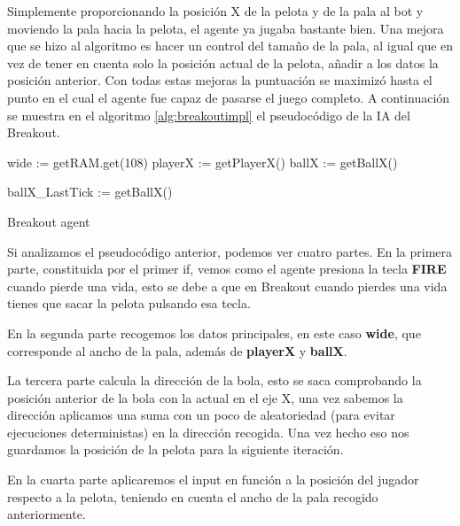 Simplemente proporcionando la posición X de la pelota y de la pala al bot y moviendo la pala hacia la pelota, el agente ya jugaba bastante bien. Una mejora que se hizo al algoritmo es hacer un control del tamaño de la pala, al igual que en vez de tener en cuenta solo la posición actual de la pelota, añadir a los datos la posición anterior. Con todas estas mejoras la puntuación se maximizó hasta el punto en el cual el agente fue capaz de pasarse el juego completo. A continuación se muestra en el algoritmo \ref{alg:breakoutimpl}
el pseudocódigo de la IA del Breakout.

\vspace{4mm}
\begin{algorithm}[H]
	
	wide := getRAM.get(108)\;
	playerX := getPlayerX()\;
	ballX := getBallX()\;
	

	ballX\_LastTick := getBallX()\;
	
	\caption{Breakout agent}
	\label{alg:breakoutimpl}
\end{algorithm}

Si analizamos el pseudocódigo anterior, podemos ver cuatro partes. En la primera parte, constituida por el primer if, vemos como el agente presiona la tecla \textbf{FIRE} cuando pierde una vida, esto se debe a que en Breakout cuando pierdes una vida tienes que sacar la pelota pulsando esa tecla. 

En la segunda parte recogemos los datos principales, en este caso \textbf{wide}, que corresponde al ancho de la pala, además de \textbf{playerX} y \textbf{ballX}. 

La tercera parte calcula la dirección de la bola, esto se saca comprobando la posición anterior de la bola con la actual en el eje X, una vez sabemos la dirección aplicamos una suma con un poco de aleatoriedad (para evitar ejecuciones deterministas) en la dirección recogida. Una vez hecho eso nos guardamos la posición de la pelota para la siguiente iteración.

En la cuarta parte aplicaremos el input en función a la posición del jugador respecto a la pelota, teniendo en cuenta el ancho de la pala recogido anteriormente.

